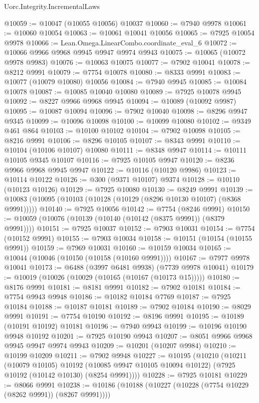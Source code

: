 \begin{lexlean}{Uorc.Integrity.IncrementalLaws}
\begin{coremodule}
@10059 := @10047 (@10055 @10056) @10037
@10060 := @7940 @9978
@10061 := @10060 @10054
@10063 := @10061 @10041 @10056
@10065 := @7925 @10054 @9978
@10066 := Lean.Omega.LinearCombo.coordinate_eval_6
@10072 := @10066 @9966 @9968 @9945 @9947 @9974 @9943
@10075 := @10065 (@10072 @9978 @9983)
@10076 := @10063 @10075
@10077 := @7902 @10041
@10078 := @8212 @9991
@10079 := @7754 @10078
@10080 := @8333 @9991
@10083 := @10077 (@10079 @10080) @10056
@10084 := @7940 @9945
@10085 := @10084 @10078
@10087 := @10085 @10040 @10080
@10089 := @7925 @10078 @9945
@10092 := @8227 @9966 @9968 @9945
@10094 := @10089 (@10092 @9987)
@10095 := @10087 @10094
@10096 := @7902 @10040
@10098 := @8296 @9947 @9345
@10099 := @10096 @10098
@10100 := @10099 @10080
@10102 := @9349 @461 @864
@10103 := @10100 @10102
@10104 := @7902 @10098
@10105 := @8216 @9991
@10106 := @8296 @10105
@10107 := @8343 @9991
@10110 := @10104 (@10106 @10107) @10080
@10111 := @8348 @9947
@10114 := @10111 @10105 @9345 @10107
@10116 := @7925 @10105 @9947
@10120 := @8236 @9966 @9968 @9945 @9947
@10122 := @10116 (@10120 @9986)
@10123 := @10114 @10122
@10126 := @300 (@9371 @10107) @9374
@10128 := @10110 (@10123 @10126)
@10129 := @7925 @10080
@10130 := @8249 @9991
@10139 := @10083 (@10095 (@10103 (@10128 (@10129 (@8296 @10130 @10107) (@8368 @9991)))))
@10140 := @7925 @10056
@10142 := @7754 (@8246 @9991)
@10150 := @10059 (@10076 (@10139 (@10140 (@10142 (@8375 @9991)) (@8379 @9991))))
@10151 := @7925 @10037
@10152 := @7903 @10031
@10154 := @7754 (@10152 @9991)
@10155 := @7903 @10034
@10158 := @10151 (@10154 (@10155 @9991))
@10159 := @7969 @10031
@10160 := @10159 @10034
@10165 := @10044 (@10046 (@10150 (@10158 (@10160 @9991))))
@10167 := @7977 @9978 @10041
@10173 := @6488 (@3997 @6481 @9938) (@7739 @9978 @10041)
@10179 := @10019 (@10026 (@10029 (@10165 (@10167 (@10173 @15)))))
@10180 := @8176 @9991
@10181 := @8181 @9991
@10182 := @7902 @10181
@10184 := @7754 @9943 @9948
@10186 := @10182 @10184 @7769
@10187 := @7925 @10184
@10188 := @10187 @10181
@10189 := @7902 @10184
@10190 := @8029 @9991
@10191 := @7754 @10190
@10192 := @8196 @9991
@10195 := @10189 (@10191 @10192) @10181
@10196 := @7940 @9943
@10199 := @10196 @10190 @9948 @10192
@10201 := @7925 @10190 @9943
@10207 := @8051 @9966 @9968 @9945 @9947 @9974 @9943
@10209 := @10201 (@10207 @9984)
@10210 := @10199 @10209
@10211 := @7902 @9948
@10227 := @10195
    (@10210
      (@10211
        (@10079 @10105)
        @10192
        (@10085 @9947 @10105 @10094 @10122)
        (@7925 @10192 (@10142 @10130) (@8254 @9991))))
@10228 := @7925 @10181
@10229 := @8066 @9991
@10238 := @10186 (@10188 (@10227 (@10228 (@7754 @10229 (@8262 @9991)) (@8267 @9991))))

\end{coremodule}
\end{lexlean}
